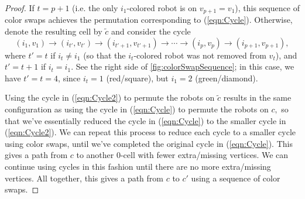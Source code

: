 \documentclass{amsart}
\newcommand{\Sr}{S_{\vec{r}}}
\newtheorem{thm}{Theorem}[section]
\theoremstyle{definition}
\theoremstyle{remark}
\begin{document}
\begin{proof}
If $t=p+1$ (i.e. the only $i_1$-colored robot is on $v_{p+1}=v_1$), this sequence of color swaps achieves the permutation corresponding to (\ref{eqn:Cycle}). Otherwise, denote the resulting cell by $\tilde c$ and consider the cycle 
\begin{equation}\label{eqn:Cycle2}
(i_1,v_1)\to(i_{t'},v_{t'})\to(i_{t'+1},v_{t'+1})\to\cdots\to(i_p,v_p)\to(i_{p+1},v_{p+1}),
\end{equation}
where $t'=t$ if $i_t\ne i_1$ (so that the $i_t$-colored robot was not removed from $v_t$), and $t'=t+1$ if $i_t=i_1.$ See the right side of \cref{fig:colorSwapSequence}; in this case, we have $t'=t=4$, since $i_t=1$ (red/square), but $i_1=2$ (green/diamond). 

Using the cycle in (\ref{eqn:Cycle2}) to permute the robots on $\tilde c$ results in the same configuration as using the cycle in (\ref{eqn:Cycle}) to permute the robots on $c,$ so that we've essentially reduced the cycle in (\ref{eqn:Cycle}) to the smaller cycle in (\ref{eqn:Cycle2}). We can repeat this process to reduce each cycle to a smaller cycle using color swaps, until we've completed the original cycle in (\ref{eqn:Cycle}). This gives a path from $c$ to another 0-cell with fewer extra/missing vertices. We can continue using cycles in this fashion until there are no more extra/missing vertices. All together, this gives a path from $c$ to $c'$ using a sequence of color swaps. 
\end{proof}

\end{document}
